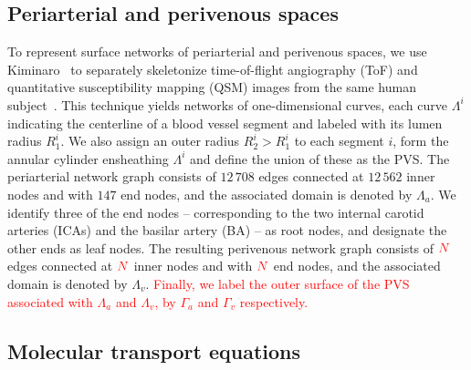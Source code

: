 \documentclass[fleqn,10pt]{wlscirep}
\newcommand{\fixme}[1]{\textcolor{red}{#1}}
\begin{document}
\subsection*{Periarterial and perivenous spaces}

To represent surface networks of periarterial and perivenous spaces,
we use Kiminaro~\cite{william_silversmith_2021_5539913} to separately
skeletonize time-of-flight angiography (ToF) and quantitative
susceptibility mapping (QSM) images from the same human
subject~\cite{hodneland2019new}. This technique yields networks of
one-dimensional curves, each curve $\Lambda^i$ indicating the
centerline of a blood vessel segment and labeled with its lumen radius
$R_1^i$. We also assign an outer radius $R_2^i > R_1^i$ to each
segment $i$, form the annular cylinder ensheathing $\Lambda^i$ and
define the union of these as the PVS. The periarterial network graph
consists of $12\,708$ edges connected at $12\,562$ inner nodes and
with $147$ end nodes, and the associated domain is denoted by
$\Lambda_a$. We identify three of the end nodes -- corresponding to
the two internal carotid arteries (ICAs) and the basilar artery (BA)
-- as root nodes, and designate the other ends as leaf nodes. The
resulting perivenous network graph consists of $\fixme{N}$ edges
connected at $\fixme{N}$ inner nodes and with $\fixme{N}$ end nodes,
and the associated domain is denoted by $\Lambda_v$. \fixme{Finally, we label
the outer surface of the PVS associated with $\Lambda_a$ and
$\Lambda_v$, by $\Gamma_a$ and $\Gamma_v$ respectively.}


\subsection*{Molecular transport equations}
\end{document}
